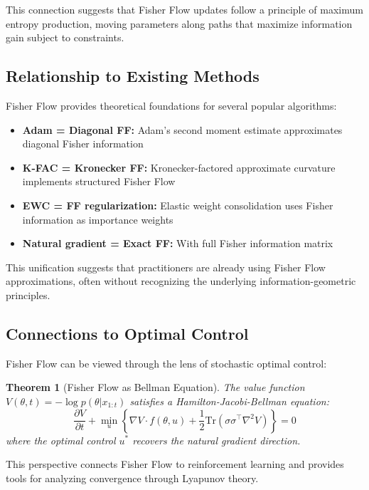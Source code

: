 \documentclass[11pt]{article}
\newtheorem{theorem}{Theorem}
\begin{document}
This connection suggests that Fisher Flow updates follow a principle of maximum entropy production, moving parameters along paths that maximize information gain subject to constraints.

\subsection{Relationship to Existing Methods}

Fisher Flow provides theoretical foundations for several popular algorithms:

\begin{itemize}
\item \textbf{Adam = Diagonal FF:} Adam's second moment estimate approximates diagonal Fisher information
\item \textbf{K-FAC = Kronecker FF:} Kronecker-factored approximate curvature implements structured Fisher Flow
\item \textbf{EWC = FF regularization:} Elastic weight consolidation uses Fisher information as importance weights
\item \textbf{Natural gradient = Exact FF:} With full Fisher information matrix
\end{itemize}

This unification suggests that practitioners are already using Fisher Flow approximations, often without recognizing the underlying information-geometric principles.

\subsection{Connections to Optimal Control}

Fisher Flow can be viewed through the lens of stochastic optimal control:

\begin{theorem}[Fisher Flow as Bellman Equation]
The value function $V(\theta, t) = -\log p(\theta|x_{1:t})$ satisfies a Hamilton-Jacobi-Bellman equation:
\begin{equation}
\frac{\partial V}{\partial t} + \min_u \left\{\nabla V \cdot f(\theta, u) + \frac{1}{2}\text{Tr}(\sigma\sigma^\top \nabla^2 V)\right\} = 0
\end{equation}
where the optimal control $u^*$ recovers the natural gradient direction.
\end{theorem}

This perspective connects Fisher Flow to reinforcement learning and provides tools for analyzing convergence through Lyapunov theory.
\end{document}

